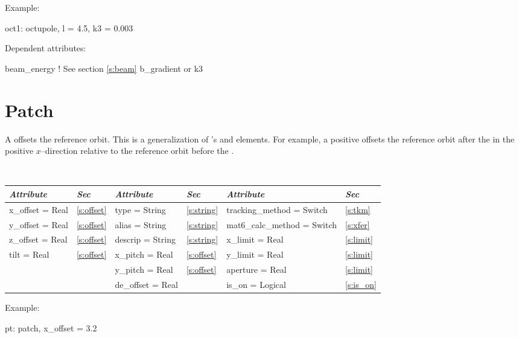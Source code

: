 \vskip0.05in \noindent
Example:
\begin{example}
  oct1: octupole, l = 4.5, k3 = 0.003
\end{example}

\vskip0.05in \noindent
Dependent attributes:
\begin{example}
  beam\_energy  ! See section \ref{s:beam}
  b\_gradient or k3
\end{example}

\section{Patch}
\label{s:patch}

A  offsets the reference orbit. This is a generalization of
\mad's  and  elements. For example, a positive
 offsets the reference orbit after the  in the
positive $x$--direction relative to the reference orbit before the
.

\toffset
\begin{center}
\tt
\begin{tabular}{|l|l||l|l||l|l|} \hline
  {\sl Attribute} & {\sl Sec}  & {\sl Attribute} & {\sl Sec} & {\sl Attribute} & {\sl Sec} \\ \hline
  x\_offset  = Real  & \ref{s:offset} &  type = String      & \ref{s:string} & tracking\_method = Switch   & \ref{s:tkm}   \\ \hline
  y\_offset  = Real  & \ref{s:offset} &  alias = String     & \ref{s:string} & mat6\_calc\_method = Switch & \ref{s:xfer}  \\ \hline
  z\_offset  = Real  & \ref{s:offset} &  descrip = String   & \ref{s:string} & x\_limit = Real             & \ref{s:limit} \\ \hline
  tilt = Real        & \ref{s:offset} &  x\_pitch   = Real  & \ref{s:offset} & y\_limit = Real             & \ref{s:limit} \\ \hline
                     &                &  y\_pitch   = Real  & \ref{s:offset} & aperture = Real             & \ref{s:limit} \\ \hline
                     &                &  de\_offset = Real  &                & is\_on = Logical            & \ref{s:is_on} \\ \hline
\end{tabular}
\end{center}
\toffset

 \noindent
Example:
\begin{example}
  pt: patch, x\_offset = 3.2
\end{example}

